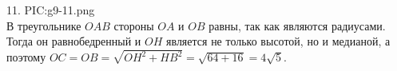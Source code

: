 11. {{PIC:g9-11.png}}\\
В треугольнике $OAB$ стороны $OA$ и $OB$ равны, так как являются радиусами. Тогда он равнобедренный и $OH$ является не только высотой, но и медианой, а поэтому $OC=OB=\sqrt{OH^2+HB^2}=\sqrt{64+16}=4\sqrt{5}.$\newpage\noindent
